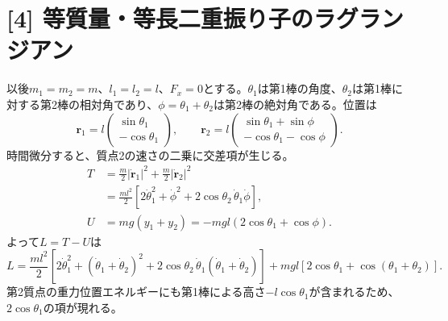 \documentclass[11pt,a4paper]{article}
\begin{document}
\section*{[4] 等質量・等長二重振り子のラグランジアン}
以後$m_1=m_2=m$、$l_1=l_2=l$、$F_x=0$とする。$\theta_1$は第1棒の角度、$\theta_2$は第1棒に対する第2棒の相対角であり、$\phi=\theta_1+\theta_2$は第2棒の絶対角である。位置は
\begin{equation}
  \boldsymbol r_1=l\begin{pmatrix}\sin\theta_1\\-\cos\theta_1\end{pmatrix},
  \qquad
  \boldsymbol r_2=l\begin{pmatrix}\sin\theta_1+\sin\phi\\-\cos\theta_1-\cos\phi\end{pmatrix}.
\end{equation}
時間微分すると、質点2の速さの二乗に交差項が生じる。
\begin{align}
  T&=\frac{m}{2}|\dot{\boldsymbol r}_1|^2+\frac{m}{2}|\dot{\boldsymbol r}_2|^2\\
   &=\frac{ml^2}{2}\left[2\dot{\theta}_1^2+\dot{\phi}^{2}
       +2\cos\theta_2\,\dot{\theta}_1\dot{\phi}\right],\\
  U&=mg(y_1+y_2)=-mgl\left(2\cos\theta_1+\cos\phi\right).
\end{align}
よって$L=T-U$は
\begin{equation}
  \boxed{L=\frac{ml^2}{2}\left[2\dot{\theta}_1^2+
    (\dot{\theta}_1+\dot{\theta}_2)^2+
    2\cos\theta_2\,\dot{\theta}_1(\dot{\theta}_1+\dot{\theta}_2)\right]
    +mgl\left[2\cos\theta_1+\cos(\theta_1+\theta_2)\right].}
\end{equation}
第2質点の重力位置エネルギーにも第1棒による高さ$-l\cos\theta_1$が含まれるため、$2\cos\theta_1$の項が現れる。
\end{document}
